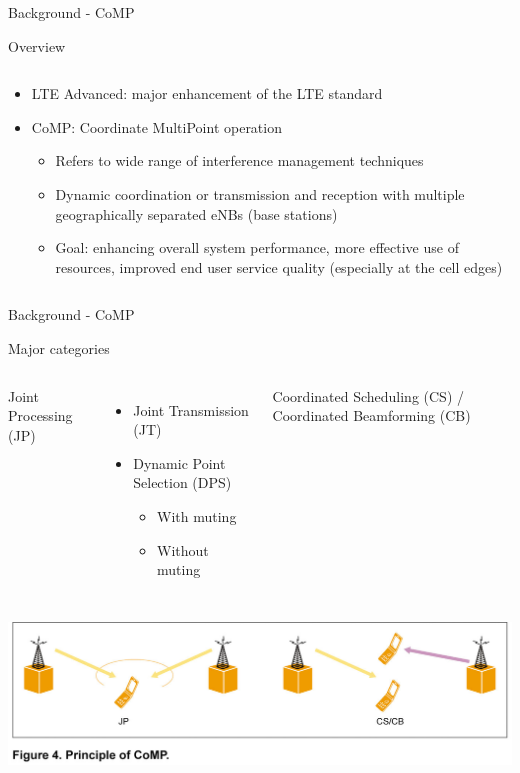 \documentclass[xcolor={cmyk}]{beamer}
\begin{document}
 
 \begin{frame}{Background - CoMP}
 	\begin{block}{Overview}
		\begin{columns}
			\begin{column}{.9\textwidth}
				\begin{itemize}
					\item LTE Advanced: major enhancement of the LTE standard
					\item CoMP: Coordinate MultiPoint operation
					\begin{itemize}
						\item Refers to wide range of interference management techniques
						\item Dynamic coordination or transmission and reception with multiple geographically separated eNBs (base stations)
						\item Goal: enhancing overall system performance, more effective use of resources, improved end user service quality (especially at the cell edges)
					\end{itemize}
				\end{itemize}
			\end{column}
		\end{columns}
	 \end{block}
 \end{frame}
 
 \begin{frame}{Background - CoMP}
 	\begin{block}{Major categories}
		\begin{columns}
			Joint Processing (JP)
				\begin{itemize}
					\item Joint Transmission (JT)
					\item Dynamic Point Selection (DPS)
					\begin{itemize}
						\item With muting
						\item Without muting
					\end{itemize}
				\end{itemize}			
			\column{.5\textwidth}
				Coordinated Scheduling (CS) / Coordinated Beamforming (CB)
		\end{columns}
		 \includegraphics[width=\linewidth,height=\textheight,keepaspectratio]{W020101021303791421974.jpg}
	 \end{block}
 \end{frame}
 
\end{document}
